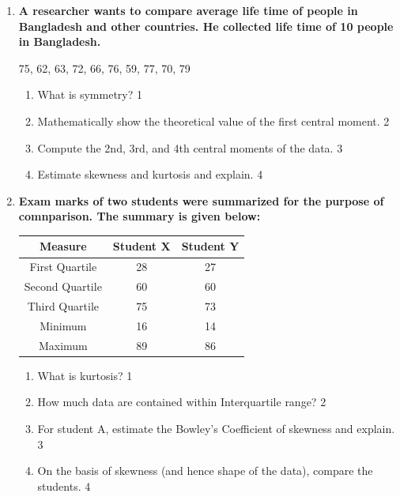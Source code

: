 \documentclass[a4paper,oneside]{book}
\begin{document}
\begin{enumerate}
   \item
	  \textbf{A researcher wants to compare average life time of people in Bangladesh and other countries. He collected life time of 10 people in Bangladesh.} 
	  
	  	\begin{center}
	  75, 62, 63, 72, 66, 76, 59, 77, 70, 79
	  	\end{center}
  
  \begin{enumerate}
    \item
	What is symmetry? \hfill 1
    \item
	Mathematically show the theoretical value of the first central moment. \hfill 2
    \item  
	Compute the 2nd, 3rd, and 4th central moments of the data. \hfill 3
    \item
	Estimate skewness and kurtosis and explain. \hfill 4
  \end{enumerate}
  
   \item
	  \textbf{Exam marks of two students were summarized for the purpose of comnparison. The summary is given below:} 
	  
	  \begin{table}[h]
	  \centering
\begin{tabular}{c|c|c}
Measure         & Student X & Student Y \\ \hline
First Quartile  & 28        & 27        \\
Second Quartile & 60        & 60        \\
Third Quartile  & 75        & 73        \\
Minimum         & 16        & 14        \\ 
Maximum         & 89        & 86        \\  \hline
\end{tabular}
\end{table}
  
  \begin{enumerate}
    \item
	What is kurtosis? \hfill 1
    \item
	How much data are contained within Interquartile range? \hfill 2
    \item  
	For student A, estimate the Bowley's Coefficient of skewness and explain. \hfill 3
    \item
	On the basis of skewness (and hence shape of the data), compare the students. \hfill 4
  \end{enumerate}

\end{enumerate}
\end{document}
